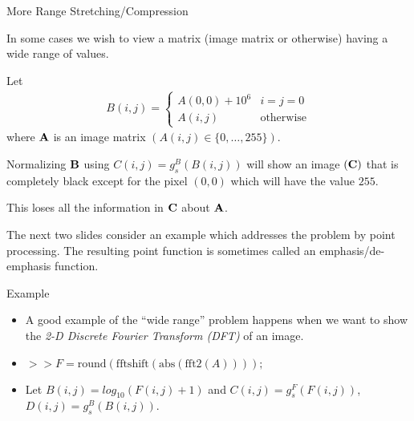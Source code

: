 %
%
\begin{slide}{More Range Stretching/Compression}
\begin{titlelist}{}{}
\small
\item<2-> 
In some cases we wish to view a matrix (image matrix
or otherwise)
having a wide range of values.

\item<3-> 
Let
\begin{eqnarray*}
B(i,j)=\left\{\begin{array}{ll}
A(0,0)+10^6 & i=j=0\\
A(i,j) & \mbox{otherwise}
\end{array}\right.
\end{eqnarray*}
where ${\bf A}$ is an image
matrix $(A(i,j)\in \{0,\ldots,255\})$.

\item<4-> Normalizing ${\bf B}$ using $C(i,j)=g_s^B(B(i,j))$
will show an image $({\bf C})$ that is completely black except for the
pixel $(0,0)$ which will have the value $255$.

\item<5->  This loses all the information in ${\bf C}$ about ${\bf
A}$.

\item<6-> 
The next two slides consider an example which addresses
the problem by point processing.
The resulting point function is sometimes called
an emphasis/de-emphasis function.

\end{titlelist}

\end{slide}



%
%
\begin{slide}{Example}
\vspace*{-9pt}
\scriptsize
\begin{itemize}
\item A good example of the ``wide range'' problem
happens when we want to show the {\em 2-D Discrete Fourier
Transform (DFT)} of an image.
\item $>> F=\mbox{round}(\mbox{fftshift}(\mbox{abs}(
\mbox{fft2}(A))));$
\item Let $B(i,j)=log_{10}(F(i,j)+1)$ and
$C(i,j)=g_s^F(F(i,j))$,
$D(i,j)=g_s^B(B(i,j))$.
\end{itemize}
\end{slide}


